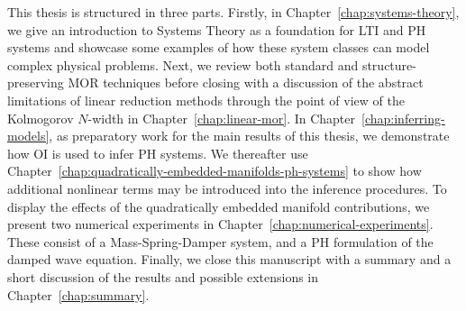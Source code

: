 This thesis is structured in three parts.
Firstly, in Chapter~\ref{chap:systems-theory}, we give an introduction to Systems Theory as a foundation for \ac{LTI} and \ac{PH} systems and showcase some examples of how these system classes can model complex physical problems.
Next, we review both standard and structure-preserving \ac{MOR} techniques before closing with a discussion of the abstract limitations of linear reduction methods through the point of view of the Kolmogorov $N$-width in Chapter~\ref{chap:linear-mor}.
In Chapter~\ref{chap:inferring-models}, as preparatory work for the main results of this thesis, we demonstrate how \ac{OI} is used to infer \ac{PH} systems.
We thereafter use Chapter~\ref{chap:quadratically-embedded-manifolds-ph-systems} to show how additional nonlinear terms may be introduced into the inference procedures.
To display the effects of the quadratically embedded manifold contributions, we present two numerical experiments in Chapter~\ref{chap:numerical-experiments}.
These consist of a Mass-Spring-Damper system, and a \ac{PH} formulation of the damped wave equation.
Finally, we close this manuscript with a summary and a short discussion of the results and possible extensions in Chapter~\ref{chap:summary}.
